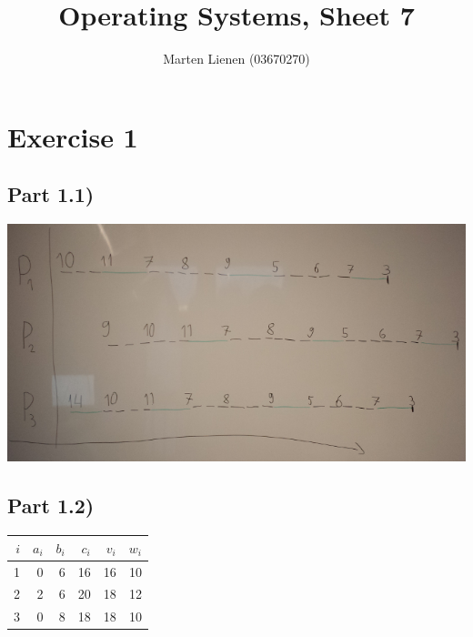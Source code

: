 \documentclass[10pt,a4paper]{article}
\title{Operating Systems, Sheet 7}
\author{Marten Lienen (03670270)}
\begin{document}
\maketitle

\section*{Exercise 1}

\subsection*{Part 1.1)}

\includegraphics[width=\textwidth]{sheet-7/exercise-1-1}

\subsection*{Part 1.2)}

\begin{tabular}{rrrrrr}
$i$ & $a_{i}$ & $b_{i}$ & $c_{i}$ & $v_{i}$ & $w_{i}$\\
\hline
1 & 0 & 6 & 16 & 16 & 10\\
2 & 2 & 6 & 20 & 18 & 12\\
3 & 0 & 8 & 18 & 18 & 10\\
\end{tabular}

\end{document}
